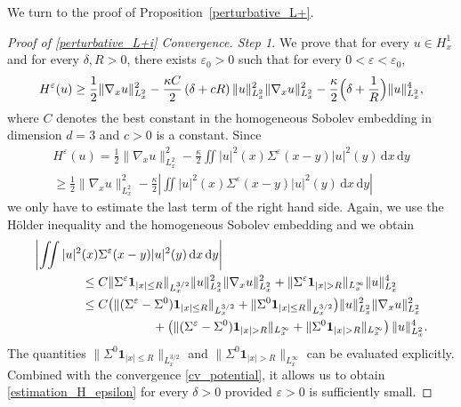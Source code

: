 \documentclass[JEP,XML,SOM,NoEqCountersInSection,NoFloatCountersInSection,Unicode,published]{cedram}
\theoremstyle{definition}
\newenvironment{ProofOf}[1]{\begin{proof}[Proof of #1]}{\end{proof}}
\newcommand{\ud}{\, {\mathrm{d}}}
\begin{document}
We turn to the proof of Proposition~\ref{perturbative_L+}.

\begin{ProofOf}{\eqref{perturbative_L+i} Convergence. Step 1}
We prove that for every $u\in H_{x}^{1}$ and for every $\delta, R>0$, there exists $\varepsilon_{0}>0$ such that for every $0<\varepsilon<\varepsilon_{0}$,
\begin{equation}\label{estimation_H_epsilon}
H^{\varepsilon}(u)\geq\frac{1}{2}\|\nabla_{x}u\|_{L_{x}^{2}}^{2}-\frac{\kappa C}{2}\left(\delta+cR\right)\|u\|_{L_{x}^{2}}^{2}\|\nabla_{x}u\|_{L_{x}^{2}}^{2}-\frac{\kappa}{2}\Bigl(\delta+\frac{1}{R}\Bigr)\|u\|_{L_{x}^{2}}^{4},
\end{equation}
where $C$ denotes the best constant in the homogeneous Sobolev embedding in dimension $d=3$ and $c>0$ is a constant. Since
\begin{multline*}
H^{\varepsilon}(u)=\frac{1}{2}\|\nabla_{x}u\|_{L_{x}^{2}}^{2}-\frac{\kappa}{2}\iint|u|^{2}(x)\Sigma^{\varepsilon}(x-y)|u|^{2}(y)\ud x\ud y\\
\geq\frac{1}{2}\|\nabla_{x}u\|_{L_{x}^{2}}^{2}-\frac{\kappa}{2}\left|\iint|u|^{2}(x)\Sigma^{\varepsilon}(x-y)|u|^{2}(y)\ud x\ud y\right|
\end{multline*}
we only have to estimate the last term of the right hand side. Again, we use the Hölder inequality and the homogeneous Sobolev embedding and we obtain
\begin{align*}
\biggl|\iint|u|^{2}&(x)\Sigma^{\varepsilon}(x-y)|u|^{2}(y)\ud x\ud y\biggr|
\\
&\leq C\|\Sigma^{\varepsilon}\mathbf{1}_{|x|\leq R}\|_{L_{x}^{3/2}}\|u\|_{L_{x}^{2}}^{2}\|\nabla_{x}u\|_{L_{x}^{2}}^{2}+\|\Sigma^{\varepsilon}\mathbf{1}_{|x|>R}\|_{L_{x}^{\infty}}\|u\|_{L_{x}^{2}}^{4}\\
&\leq C\bigl(\|(\Sigma^{\varepsilon}-\Sigma^{0})\mathbf{1}_{|x|\leq R}\|_{L_{x}^{3/2}}+\|\Sigma^{0}\mathbf{1}_{|x|\leq R}\|_{L_{x}^{3/2}}\bigr)\|u\|_{L_{x}^{2}}^{2}\|\nabla_{x}u\|_{L_{x}^{2}}^{2}\\
&\hspace*{2cm}+\left(\|(\Sigma^{\varepsilon}-\Sigma^{0})\mathbf{1}_{|x|>R}\|_{L_{x}^{\infty}}+\|\Sigma^{0}\mathbf{1}_{|x|>R}\|_{L_{x}^{\infty}}\right)\|u\|_{L_{x}^{2}}^{4}.
\end{align*}
The quantities $\|\Sigma^{0}\mathbf{1}_{|x|\leq R}\|_{L_{x}^{3/2}}$ and $\|\Sigma^{0}\mathbf{1}_{|x|>R}\|_{L_{x}^{\infty}}$ can be evaluated
explicitly. Combined with the convergence \eqref{cv_potential}, it allows us to obtain \eqref{estimation_H_epsilon} for every $\delta>0$ provided $\varepsilon>0$ is sufficiently small.


\end{ProofOf}
\end{document}
